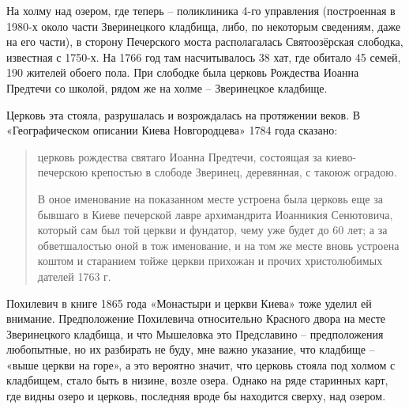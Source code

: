 На холму над озером, где теперь – поликлиника 4-го управления (построенная в 1980-х около части Зверинецкого кладбища, либо, по некоторым сведениям, даже на его части), в сторону Печерского моста располагалась Святоозёрская слободка, известная с 1750-х. На 1766 год там насчитывалось 38 хат, где обитало 45 семей, 190 жителей обоего пола. При слободке была церковь Рождества Иоанна Предтечи со школой, рядом же на холме – Зверинецкое кладбище.

Церковь эта стояла, разрушалась и возрождалась на протяжении веков. В «Географическом описании Киева Новгородцева» 1784 года\cite{sbornikmat} сказано:

\begin{quotation}
церковь рождества святаго Иоанна Предтечи, состоящая за киево-печерскою крепостью в слободе Зверинец, деревянная, с такоюж оградою.

В оное именование на показанном месте устроена была церковь еще за бывшаго в Киеве печерской лавре архимандрита Иоанникия Сенютовича, который сам был той церкви и фундатор, чему уже будет до 60 лет; а за обветшалостью оной в тож именование, и на том же месте вновь устроена коштом и старанием тойже церкви прихожан и прочих христолюбимых дателей 1763 г.
\end{quotation}

Похилевич в книге 1865 года «Монастыри и церкви Киева» тоже уделил ей внимание. Предположение Похилевича относительно Красного двора на месте Зверинецкого кладбища, и что Мышеловка это Предславино – предположения любопытные, но их разбирать не буду, мне важно указание, что кладбище – «выше церкви на горе», а это вероятно значит, что церковь стояла под холмом с кладбищем, стало быть в низине, возле озера. Однако на ряде старинных карт, где видны озеро и церковь, последняя вроде бы находится сверху, над озером.


